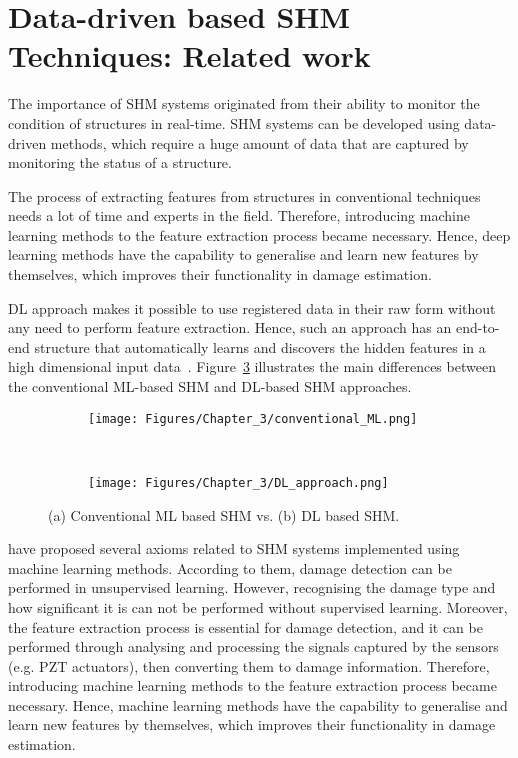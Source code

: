 \section{Data-driven based SHM Techniques: Related work}
\label{sec33}
The importance of SHM systems originated from their ability to monitor the condition of structures in real-time.
SHM systems can be developed using data-driven methods, which require a huge amount of data that are captured by monitoring the status of a structure.

The process of extracting features from structures in conventional techniques needs a lot of time and experts in the field. 
Therefore, introducing machine learning methods to the feature extraction process became necessary.
Hence, deep learning methods have the capability to generalise and learn new features by themselves, which improves their functionality in damage estimation.

DL approach makes it possible to use registered data in their raw form without any need to perform feature extraction.
Hence, such an approach has an end-to-end structure that automatically learns and discovers the hidden features in a high dimensional input data~\cite{LeCun, Networks}. 
Figure~\ref{fig:ML_vs_DL} illustrates the main differences between the conventional ML-based SHM and DL-based SHM approaches.

\begin{figure}[!ht]
	\centering
	\begin{subfigure}{1\textwidth}		
		\centering
		\texttt{[image: Figures/Chapter\_3/conventional\_ML.png]}
		\caption{} 
		\label{fig:ML_conventional}
	\end{subfigure}
	\\
	\begin{subfigure}{1\textwidth}
		\centering
		\texttt{[image: Figures/Chapter\_3/DL\_approach.png]}
		\caption{} 
		\label{fig:DL_approach}
	\end{subfigure}	
	\caption{(a) Conventional ML based SHM vs. (b) DL based SHM.}
	\label{fig:ML_vs_DL}
\end{figure}
\textcite{Worden2007} have proposed several axioms related to SHM systems implemented using machine learning methods. 
According to them, damage detection can be performed in unsupervised learning.
However, recognising the damage type and how significant it is can not be performed without supervised learning. 
Moreover, the feature extraction process is essential for damage detection, and it can be performed through analysing and processing the signals captured by the sensors (e.g. PZT actuators), then converting them to damage information.
Therefore, introducing machine learning methods to the feature extraction process became necessary.
Hence, machine learning methods have the capability to generalise and learn new features by themselves, which improves their functionality in damage estimation.


